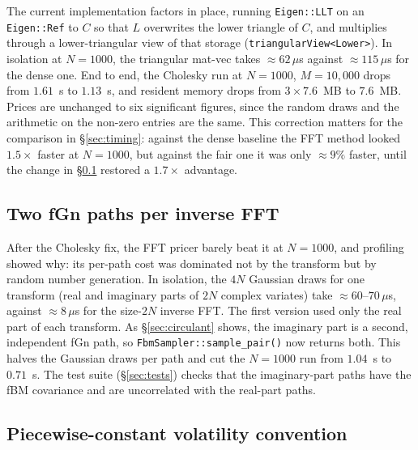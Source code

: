 The current implementation factors in place, running \texttt{Eigen::LLT} on an
\texttt{Eigen::Ref} to $C$ so that $L$ overwrites the lower triangle of $C$, and
multiplies through a lower-triangular view of that storage
(\texttt{triangularView<Lower>}).  In
isolation at $N = 1000$, the triangular mat-vec takes $\approx 62\,\mu$s against
$\approx 115\,\mu$s for the dense one.  End to end, the Cholesky run at $N = 1000$,
$M = 10{,}000$ drops from $1.61$~s to $1.13$~s, and resident memory drops from
$3 \times 7.6$~MB to $7.6$~MB.  Prices are unchanged to six significant figures,
since the random draws and the arithmetic on the non-zero entries are the same.
This correction matters for the comparison in §\ref{sec:timing}: against the dense
baseline the FFT method looked $1.5\times$ faster at $N = 1000$, but against the fair
one it was only $\approx 9\%$ faster, until the change in §\ref{sec:two-paths}
restored a $1.7\times$ advantage.

\subsection{Two fGn paths per inverse FFT}
\label{sec:two-paths}

After the Cholesky fix, the FFT pricer barely beat it at $N = 1000$, and profiling
showed why: its per-path cost was dominated not by the transform but by random
number generation.  In isolation, the $4N$ Gaussian draws for one transform (real
and imaginary parts of $2N$ complex variates) take $\approx 60$--$70\,\mu$s, against
$\approx 8\,\mu$s for the size-$2N$ inverse FFT.  The first version used only the real
part of each transform.  As §\ref{sec:circulant} shows, the imaginary part is a
second, independent fGn path, so \texttt{FbmSampler::sample\_pair()} now returns both.
This halves the Gaussian draws per path and cut the $N = 1000$ run from $1.04$~s to
$0.71$~s.  The test suite (§\ref{sec:tests}) checks that the imaginary-part paths have
the fBM covariance and are uncorrelated with the real-part paths.

\subsection{Piecewise-constant volatility convention}
\label{sec:volconv}

